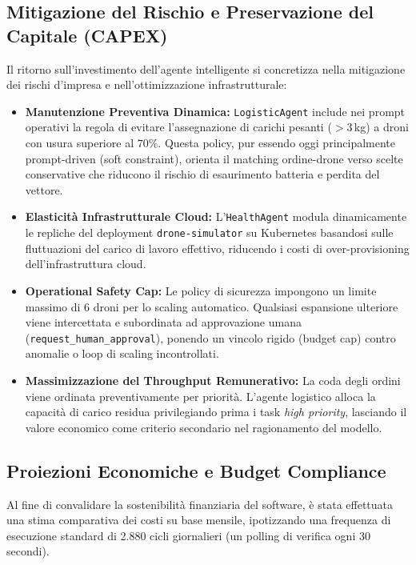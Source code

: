 \subsection{Mitigazione del Rischio e Preservazione del Capitale (CAPEX)}
Il ritorno sull'investimento dell'agente intelligente si concretizza nella mitigazione dei rischi d'impresa e nell'ottimizzazione infrastrutturale:
\begin{itemize}
    \item \textbf{Manutenzione Preventiva Dinamica:} \texttt{LogisticAgent} include nei prompt operativi la regola di evitare l'assegnazione di carichi pesanti ($>3$\,kg) a droni con usura superiore al $70\%$. Questa policy, pur essendo oggi principalmente prompt-driven (soft constraint), orienta il matching ordine-drone verso scelte conservative che riducono il rischio di esaurimento batteria e perdita del vettore.
    \item \textbf{Elasticità Infrastrutturale Cloud:} L'\texttt{HealthAgent} modula dinamicamente le repliche del deployment \texttt{drone-simulator} su Kubernetes basandosi sulle fluttuazioni del carico di lavoro effettivo, riducendo i costi di over-provisioning dell'infrastruttura cloud.
    \item \textbf{Operational Safety Cap:} Le policy di sicurezza impongono un limite massimo di 6 droni per lo scaling automatico. Qualsiasi espansione ulteriore viene intercettata e subordinata ad approvazione umana (\texttt{request\_human\_approval}), ponendo un vincolo rigido (budget cap) contro anomalie o loop di scaling incontrollati.
    \item \textbf{Massimizzazione del Throughput Remunerativo:} La coda degli ordini viene ordinata preventivamente per priorità. L'agente logistico alloca la capacità di carico residua privilegiando prima i task \textit{high priority}, lasciando il valore economico come criterio secondario nel ragionamento del modello.
\end{itemize}

\label{sec:opex_budget}

\subsection*{Proiezioni Economiche e Budget Compliance}
Al fine di convalidare la sostenibilità finanziaria del software, è stata effettuata una stima comparativa dei costi su base mensile, ipotizzando una frequenza di esecuzione standard di 2.880 cicli giornalieri (un polling di verifica ogni 30 secondi).

